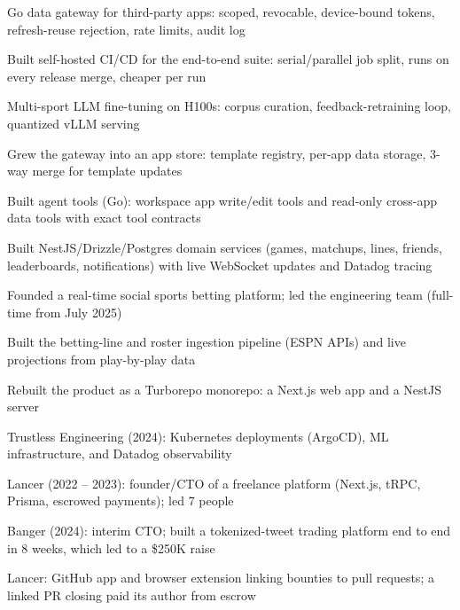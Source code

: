 \documentclass[print]{jack-resume}
\begin{document}
\begin{tightemize}
    \item Go data gateway for third-party apps: scoped, revocable, device-bound tokens, refresh-reuse rejection, rate limits, audit log
    \item Built self-hosted CI/CD for the end-to-end suite: serial/parallel job split, runs on every release merge, cheaper per run
    \item Multi-sport LLM fine-tuning on H100s: corpus curation, feedback-retraining loop, quantized vLLM serving
    \item Grew the gateway into an app store: template registry, per-app data storage, 3-way merge for template updates
    \item Built agent tools (Go): workspace app write/edit tools and read-only cross-app data tools with exact tool contracts
\end{tightemize}
\sectionsep

\begin{tightemize}
    \item Built NestJS/Drizzle/Postgres domain services (games, matchups, lines, friends, leaderboards, notifications) with live WebSocket updates and Datadog tracing
    \item Founded a real-time social sports betting platform; led the engineering team (full-time from July 2025)
    \item Built the betting-line and roster ingestion pipeline (ESPN APIs) and live projections from play-by-play data
    \item Rebuilt the product as a Turborepo monorepo: a Next.js web app and a NestJS server
\end{tightemize}
\sectionsep

\begin{tightemize}
    \item Trustless Engineering (2024): Kubernetes deployments (ArgoCD), ML infrastructure, and Datadog observability
    \item Lancer (2022 -- 2023): founder/CTO of a freelance platform (Next.js, tRPC, Prisma, escrowed payments); led 7 people
    \item Banger (2024): interim CTO; built a tokenized-tweet trading platform end to end in 8 weeks, which led to a \$250K raise
    \item Lancer: GitHub app and browser extension linking bounties to pull requests; a linked PR closing paid its author from escrow
\end{tightemize}
\sectionsep
\end{document}
